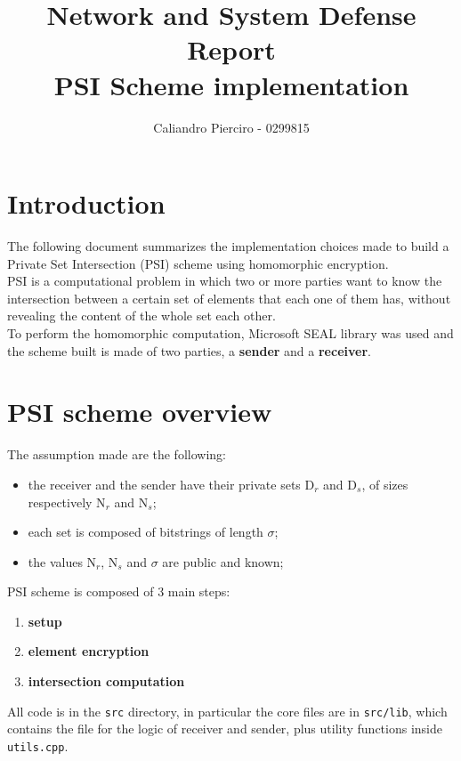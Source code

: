 \documentclass[10pt]{extarticle}
\title{Network and System Defense Report\\PSI Scheme implementation}
\author{Caliandro Pierciro - 0299815}
\begin{document}
\maketitle
\tableofcontents
\newpage

\section{Introduction}
The following document summarizes the implementation choices made to build a Private Set Intersection (PSI) scheme using homomorphic encryption.\\
PSI is a computational problem in which two or more parties want to know the intersection between a certain set of elements that each one of them has, without revealing the content of the whole set each other.\\
To perform the homomorphic computation, Microsoft SEAL library\cite{1} was used and the scheme built is made of two parties, a \textbf{sender} and a \textbf{receiver}.
\section{PSI scheme overview}
The assumption made are the following:
\begin{itemize}
	\item the receiver and the sender have their private sets D$_r$ and D$_s$, of sizes respectively N$_r$ and N$_s$;
	\item each set is composed of bitstrings of length $\sigma$;
	\item the values N$_r$, N$_s$ and $\sigma$ are public and known;
\end{itemize}
PSI scheme is composed of 3 main steps:
\begin{enumerate}
	\item \textbf{setup}
	\item \textbf{element encryption}
	\item \textbf{intersection computation}
\end{enumerate}
All code is in the \texttt{src} directory, in particular the core files are in \texttt{src/lib}, which contains the file for the logic of receiver and sender, plus utility functions inside \texttt{utils.cpp}.
\end{document}
